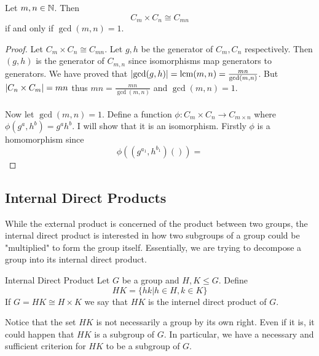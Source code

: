\documentclass[a4paper]{article}
\begin{document}
\begin{prp}{}{} Let $m,n\in\mathbb{N}$. Then $$C_m\times C_n\cong C_{mn}$$ if and only if $\gcd(m,n)=1$. \tcbline
\begin{proof}
Let $C_m\times C_n\cong C_{mn}$. Let $g,h$ be the generator of $C_m,C_n$ respectively. Then $(g,h)$ is the generator of $C_{m,n}$ since isomorphisms map generators to generators. We have proved that $\abs{\gcd(g,h)}=\operatorname{lcm}(m,n)=\frac{mn}{\gcd(m,n)}$. But $\abs{C_n\times C_m}=mn$ thus $mn=\frac{mn}{\gcd(m,n)}$ and $\gcd(m,n)=1$. \\~\\
Now let $\gcd(m,n)=1$. Define a function $\phi:C_m\times C_n\to C_{m\times n}$ where $\phi(g^a,h^b)=g^ah^b$. I will show that it is an isomorphism. Firstly $\phi$ is a homomorphism since $$\phi((g^{a_1},h^{b_1})())=$$
\end{proof}
\end{prp}

\subsection{Internal Direct Products}
While the external product is concerned of the product between two groups, the internal direct product is interested in how two subgroups of a group could be "multiplied" to form the group itself. Essentially, we are trying to decompose a group into its internal direct product. 

\begin{defn}{Internal Direct Product}{} Let $G$ be a group and $H,K\leq G$. Define $$HK=\{hk|h\in H,k\in K\}$$ If $G=HK\cong H\times K$ we say that $HK$ is the internel direct product of $G$. 
\end{defn}

Notice that the set $HK$ is not necessarily a group by its own right. Even if it is, it could happen that $HK$ is a subgroup of $G$. In particular, we have a necessary and sufficient criterion for $HK$ to be a subgroup of $G$. 
\end{document}
